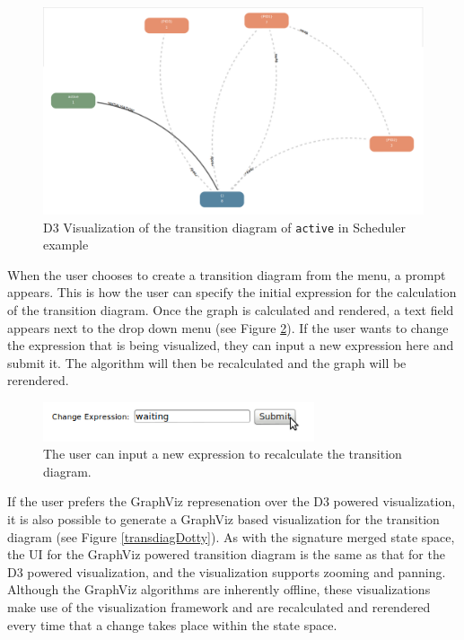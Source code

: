 \begin{center}
\begin{figure}[h!]
\centering
\includegraphics[width=14cm]{bilder/transdiag.png}
\caption{D3 Visualization of the transition diagram of \texttt{active} in Scheduler example}
\label{transdiag}
\end{figure}
\end{center} 

When the user chooses to create a transition diagram from the menu, a prompt appears. This is how the user can specify the initial expression for the calculation of the transition diagram. Once the graph is calculated and rendered, a text field appears next to the drop down menu (see Figure \ref{transDiagUI}). If the user wants to change the expression that is being visualized, they can input a new expression here and submit it. The algorithm will then be recalculated and the graph will be rerendered.

\begin{center}
\begin{figure}[h!]
\centering
\includegraphics[width=8cm]{bilder/transDiag-UI.png}
\caption{The user can input a new expression to recalculate the transition diagram.}
\label{transDiagUI}
\end{figure}
\end{center}

If the user prefers the GraphViz represenation over the D3 powered visualization, it is also possible to generate a GraphViz based visualization for the transition diagram (see Figure \ref{transdiagDotty}). As with the signature merged state space, the UI for the GraphViz powered transition diagram is the same as that for the D3 powered visualization, and the visualization supports zooming and panning. Although the GraphViz algorithms are inherently offline, these visualizations make use of the visualization framework and are recalculated and rerendered every time that a change takes place within the state space.

